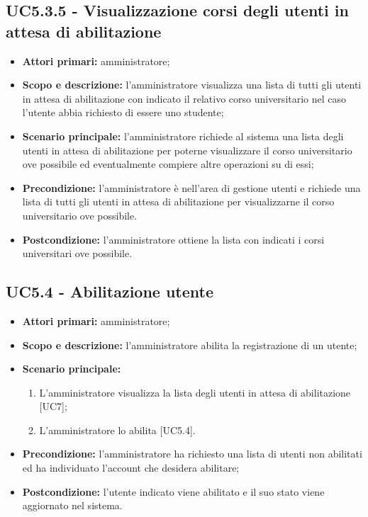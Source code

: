 \documentclass[AnalisiDeiRequisiti.tex]{subfiles}
\begin{document}
\subsection{UC5.3.5 - Visualizzazione corsi degli utenti in attesa di abilitazione}
\begin{itemize}
	\item \textbf{Attori primari:} amministratore;
	\item \textbf{Scopo e descrizione:} l'amministratore visualizza una lista di tutti gli utenti in attesa di abilitazione con indicato il relativo corso universitario nel caso l'utente abbia richiesto di essere uno studente;
	\item \textbf{Scenario principale:} l'amministratore richiede al sistema una lista degli utenti in attesa di abilitazione per poterne visualizzare il corso universitario ove possibile ed eventualmente compiere altre operazioni su di essi;
	\item \textbf{Precondizione:} l'amministratore è nell'area di gestione utenti e richiede una lista di tutti gli utenti in attesa di abilitazione per visualizzarne il corso universitario ove possibile.
	\item \textbf{Postcondizione:} l'amministratore ottiene la lista con indicati i corsi universitari ove possibile.
\end{itemize}
\subsection{UC5.4 - Abilitazione utente}
\begin{itemize}
	\item \textbf{Attori primari:} amministratore;
	\item \textbf{Scopo e descrizione:} l'amministratore abilita la registrazione di un utente;
	\item \textbf{Scenario principale:}
	\begin{enumerate}
		\item L'amministratore visualizza la lista degli utenti in attesa di abilitazione [UC7];
		\item L'amministratore lo abilita [UC5.4].
	\end{enumerate}
	\item \textbf{Precondizione:} l'amministratore ha richiesto una lista di utenti non abilitati ed ha individuato l'account che desidera abilitare; 
	\item \textbf{Postcondizione:} l'utente indicato viene abilitato e il suo stato viene aggiornato nel sistema.
\end{itemize}
\end{document}
